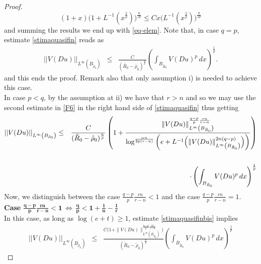 \documentclass[12pt]{amsart}
\theoremstyle{definition}
\numberwithin{equation}{section}
\numberwithin{equation}{section}
\begin{document}
{\begin{proof}
$$ (1+x)\big(1+L^{-1}(x^{\frac{2}{p}})\big)^{\frac{n}{2p}}\le Cx\big(L^{-1}(x^{\frac{2}{p}})\big)^{\frac{n}{2p}}$$
and summing the results we end up with \eqref{eq-elem}.
Note that,  in case $q=p$,  estimate \eqref{stimaquasifin} reads as
\begin{eqnarray}\label{stimafinp=q}
	||V(Du)||_{L^{\infty}(B_{\tilde\rho_0})} &\le&  \frac{C}{({\tilde{R_0}- \tilde{\rho_0}})^{\frac{n}{p}}}  \left(\int_{B_{ \tilde R_0}}V(Du)^{p}
\, dx\right)^{\frac{1}{p}}.
\end{eqnarray}
and this ends the proof. Remark also that only assumption {i)} is needed to achieve this case.
\\
In case $p<q$, by the assumption at ii) we have  that $r>n$ and so we may use the second estimate in \eqref{F6} in the right hand side of   \eqref{stimaquasifin} thus getting
\begin{eqnarray}\label{stimaquasifinbis}
	||V(Du)||_{L^\infty\left(B_{ \tilde\rho_0}\right)} %
&\le & \frac{C}{(\tilde R_0- \tilde\rho_0 )^{\frac{n}{p}}} \left(1+\frac{\|V(Du)\|^{\frac{q-p}{p}\frac{rn}{r-n}}_{L^\infty\left(B_{ \tilde R_0}\right)}}{\log^{{\frac{\alpha n}{2p(r-n)}}}\left(e+L^{-1} \Big(\|V(Du)\|^{2n(q-p)}_{L^\infty\left(B_{ \tilde R_0}\right)}\Big)\right)}\right) \cr\cr  
    && \qquad \cdot\left(\int_{B_{ \tilde R_0}}V(Du)^{p}
\, dx\right)^{\frac{1}{p}}
\end{eqnarray}
Now, we distinguish between the case 
$\frac{q-p}{p}\frac{rn}{r-n}<1$ and the case $\frac{q-p}{p}\frac{rn}{r-n}=1$.
\\
{\bf Case} $\mathbf{\frac{q-p}{p}\frac{rn}{r-n}<1{\,\Longleftrightarrow\,\frac{q}{p}<1+\frac{1}{n}-\frac{1}{r}}
}$ 
\\
In this case, as long as $\log(e+t)\ge 1$, estimate \eqref{stimaquasifinbis} implies
\begin{eqnarray*}\label{stimaquafinbis}
	||V(Du)||_{L^{\infty}(B_{\tilde\rho_0})} &\le&  \frac{C\Big(1+\|V(Du)\|^{{\frac{q-p}{p}\frac{rn}{r-n}}}_{L^\infty\left(B_{ \tilde R_0}\right)}\Big)}{( \tilde R_0- \tilde \rho_0 )^{\frac{n}{p}}}  \left(\int_{B_{ \tilde R_0}}V(Du)^{p}
\, dx\right)^{\frac{1}{p}}

\end{eqnarray*}
\end{proof}}
\end{document}
